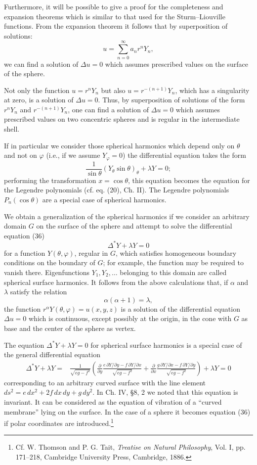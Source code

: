 Furthermore, it will be possible to give a proof for the completeness and expansion theorems which is similar to that used for the Sturm--Liouville functions. From the expansion theorem it follows that by superposition of solutions:
\[
u=\sum_{n=0}^{\infty}a_nr^nY_n,
\]
we can find a solution of $\Delta u=0$ which assumes prescribed values on the surface of the sphere.

Not only the function $u=r^nY_n$ but also $u=r^{-(n+1)}Y_n$, which has a singularity at zero, is a solution of $\Delta u=0$. Thus, by superposition of solutions of the form $r^nY_n$ and $r^{-(n+1)}Y_n$, one can find a solution of $\Delta u=0$ which assumes prescribed values on two concentric spheres and is regular in the intermediate shell.

If in particular we consider those spherical harmonics which depend only on $\theta$ and not on $\varphi$ (i.e., if we assume $Y_\varphi=0$) the differential equation takes the form
\[
\frac1{\sin\theta}(Y_\theta\sin\theta)_\theta+\lambda Y=0;
\]
performing the transformation $x=\cos\theta$, this equation becomes the equation for the Legendre polynomials (cf. eq. (20), Ch. II). The Legendre polynomials $P_n(\cos\theta)$ are a special case of spherical harmonics.

We obtain a generalization of the spherical harmonics if we consider an arbitrary domain $G$ on the surface of the sphere and attempt to solve the differential equation (36)
\[
\Delta^*Y+\lambda Y=0
\]
for a function $Y(\theta,\varphi)$, regular in $G$, which satisfies homogeneous boundary conditions on the boundary of $G$; for example, the function may be required to vanish there. Eigenfunctions $Y_1,Y_2,\ldots$ belonging to this domain are called spherical surface harmonics. It follows from the above calculations that, if $\alpha$ and $\lambda$ satisfy the relation
\[
\alpha(\alpha+1)=\lambda,
\]
the function $r^\alpha Y(\theta,\varphi)=u(x,y,z)$ is a solution of the differential equation $\Delta u=0$ which is continuous, except possibly at the origin, in the cone with $G$ as base and the center of the sphere as vertex.

The equation $\Delta^*Y+\lambda Y=0$ for spherical surface harmonics is a special case of the general differential equation
\[
\begin{aligned}
\Delta^*Y+\lambda Y
={}&\frac1{\sqrt{eg-f^2}}
\left(
\frac{\partial}{\partial y}
\frac{e\,\partial Y/\partial y-f\,\partial Y/\partial x}{\sqrt{eg-f^2}}
+\frac{\partial}{\partial x}
\frac{g\,\partial Y/\partial x-f\,\partial Y/\partial y}{\sqrt{eg-f^2}}
\right)
+\lambda Y=0
\end{aligned}
\]
corresponding to an arbitrary curved surface with the line element $ds^2=e\,dx^2+2f\,dx\,dy+g\,dy^2$. In Ch. IV, \S8, 2 we noted that this equation is invariant. It can be considered as the equation of vibration of a ``curved membrane'' lying on the surface. In the case of a sphere it becomes equation (36) if polar coordinates are introduced.\footnote{Cf. W. Thomson and P. G. Tait, \emph{Treatise on Natural Philosophy}, Vol. I, pp. 171--218, Cambridge University Press, Cambridge, 1886.}

